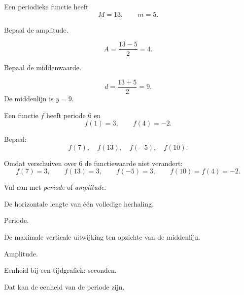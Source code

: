 \documentclass{ximera}
\begin{document}
\begin{oefening}{\oefB\ESS}

Een periodieke functie heeft
\[
M=13,\qquad m=5.
\]

\begin{question}
Bepaal de amplitude.
\begin{oplossing}
\[
A=\frac{13-5}{2}=4.
\]
\end{oplossing}
\end{question}

\begin{question}
Bepaal de middenwaarde.
\begin{oplossing}
\[
d=\frac{13+5}{2}=9.
\]
De middenlijn is \(y=9\).
\end{oplossing}
\end{question}
\end{oefening}

\begin{oefening}{\oefB\ESS}

Een functie \(f\) heeft periode \(6\) en
\[
f(1)=3,\qquad f(4)=-2.
\]

Bepaal:
\[
f(7),\quad f(13),\quad f(-5),\quad f(10).
\]

\begin{oplossing}
Omdat verschuiven over \(6\) de functiewaarde niet verandert:
\[
f(7)=3,\qquad f(13)=3,\qquad f(-5)=3,\qquad f(10)=f(4)=-2.
\]
\end{oplossing}
\end{oefening}

\begin{oefening}{\oefB\ESS}
Vul aan met \emph{periode} of \emph{amplitude}.

\begin{question}
De horizontale lengte van één volledige herhaling.
\begin{oplossing}
Periode.
\end{oplossing}
\end{question}

\begin{question}
De maximale verticale uitwijking ten opzichte van de middenlijn.
\begin{oplossing}
Amplitude.
\end{oplossing}
\end{question}

\begin{question}
Eenheid bij een tijdgrafiek: seconden.
\begin{oplossing}
Dat kan de eenheid van de periode zijn.
\end{oplossing}
\end{question}
\end{oefening}
\end{document}
